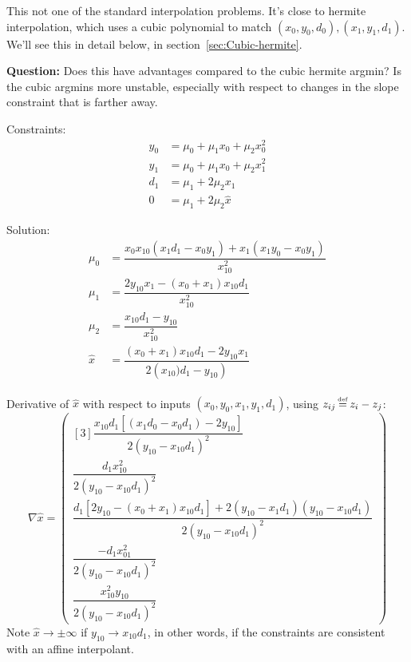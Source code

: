 \label{sec:monomial-yyd}

This not one of the standard interpolation problems.
It's close to hermite interpolation,
which uses a cubic polynomial to match
$(x_0,y_0,d_0),(x_1,y_1,d_1)$.
We'll see this in detail below,
in section~\ref{sec:Cubic-hermite}.

\textbf{Question:}
Does this have advantages compared to the cubic hermite argmin?
Is the cubic argmins more
unstable, especially with respect to changes in the
slope constraint that is farther away.

% 

Constraints:
\begin{align}
y_0 & = \mu_0+\mu_1 x_0+\mu_2 x_0^{2}  
\\
y_1 & = \mu_0+\mu_1 x_0+\mu_2 x_1^{2}  
\nonumber
\\
d_1 & = \mu_1 + 2 \mu_2 x_1  
\nonumber
\\
0 & = \mu_1 + 2 \mu_2 \hat{x}  
\nonumber
\end{align}

Solution:
\begin{align}
\mu_0 & =
\dfrac{
x_0 x_{10} \left( x_1 d_1 - x_0 y_1 \right) 
+ x_1 \left( x_1 y_0 - x_0 y_1 \right)
}{x_{10}^{2}}
\\
\mu_1 & =
\dfrac{2 y_{10} x_1 - \left(x_0+x_1\right) x_{10} d_1}{x_{10}^{2}}
\nonumber
\\
\mu_2 & = \dfrac{x_{10} d_1 - y_{10}}{x_{10}^{2}}
\nonumber 
\\
\hat{x} & =
\dfrac{
\left(x_0+x_1\right) x_{10} d_1 - 2 y_{10} x_1
}{2 \left(x_{10}) d_1 - y_{10} \right)}
\nonumber 
\end{align}

Derivative of $\hat{x}$ with respect to inputs
$(x_0,y_0,x_1,y_1,d_1)$,
using $z_{ij} \operatorname*{\overset{\underset{\mathrm{def}}{}}{=}} z_i - z_j$:
\begin{equation}
\nabla \hat{x} =
\begin{pmatrix}[3]
\dfrac{
x_{10} d_1 \left[ \left(x_1 d_0 - x_0 d_1 \right) -2 y_{10}\right]
}{
2 \left(y_{10} - x_{10} d_1\right)^{2}
}
\\
\dfrac{
d_1 x_{10}^{2}
}{
2 \left(y_{10} - x_{10} d_1\right)^{2}
} 
\\
\dfrac{
d_1 \left[ 2 y_{10} - \left( x_0 + x_1 \right) x_{10} d_1 \right]
+
2 
\left(y_{10} - x_1 d_1 \right) \left( y_{10} - x_{10} d_1 \right)
}{
2 \left(y_{10} - x_{10} d_1\right)^{2}
}
\\
\dfrac{
-d_1 x_{01}^{2}
}{
2 \left(y_{10} - x_{10} d_1\right)^{2}
}
\\ 
\dfrac{x_{10}^{2} y_{10}}{
2 \left(y_{10} - x_{10} d_1\right)^{2}
}
\end{pmatrix}
\end{equation}
Note $\hat{x} \to \pm \infty$ if $y_{10} \to x_{10} d_1$,
in other words, if the constraints are consistent with an
affine interpolant.

